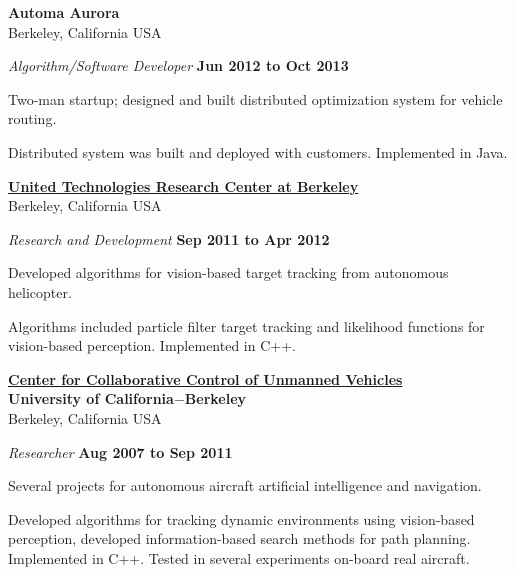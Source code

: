 \documentclass[10pt]{article}
\newenvironment{outerlist}[1][\enskip\textbullet]%
        {\begin{itemize}[#1]}{\end{itemize}%
         \vspace{-.6\baselineskip}}
\newenvironment{innerlist}[1][\enskip\textbullet]%
        {\begin{compactitem}[#1]}{\end{compactitem}}
\newcommand{\halfblankline}{\quad\vspace{-0.5\baselineskip}\pagebreak[3]}
\begin{document}
\halfblankline

\textbf{Automa Aurora}\\
Berkeley, California USA
\begin{outerlist}
\item[] \textit{Algorithm/Software Developer}%
        \hfill \textbf{Jun 2012 to Oct 2013}
\begin{innerlist}
\item Two-man startup; designed and built distributed optimization system for vehicle routing.
\item Distributed system was built and deployed with customers. Implemented in Java.
\end{innerlist}
\end{outerlist}

\halfblankline

\href{http://www.utrc.utc.com/}{\textbf{United Technologies Research Center at Berkeley}}\\
Berkeley, California USA
\begin{outerlist}
\item[] \textit{Research and Development}%
        \hfill \textbf{Sep 2011 to Apr 2012}
\begin{innerlist}
\item Developed algorithms for vision-based target tracking from autonomous helicopter.
\item Algorithms included particle filter target tracking and likelihood functions for vision-based perception. Implemented in C++.
\end{innerlist}
\end{outerlist}

\halfblankline

%
\href{http://c3uv.berkeley.edu/}{\textbf{Center for Collaborative Control of Unmanned Vehicles}}\\
\textbf{University of California$-$Berkeley}\\
Berkeley, California USA
\begin{outerlist}
\item[] \textit{Researcher}%
        \hfill \textbf{Aug 2007 to Sep 2011}
\begin{innerlist}
\item Several projects for autonomous aircraft artificial intelligence and navigation.
\item Developed algorithms for tracking dynamic environments using vision-based perception, developed information-based search methods for path planning. Implemented in C++. Tested in several experiments on-board real aircraft.
\end{innerlist}
\end{outerlist}
\end{document}
